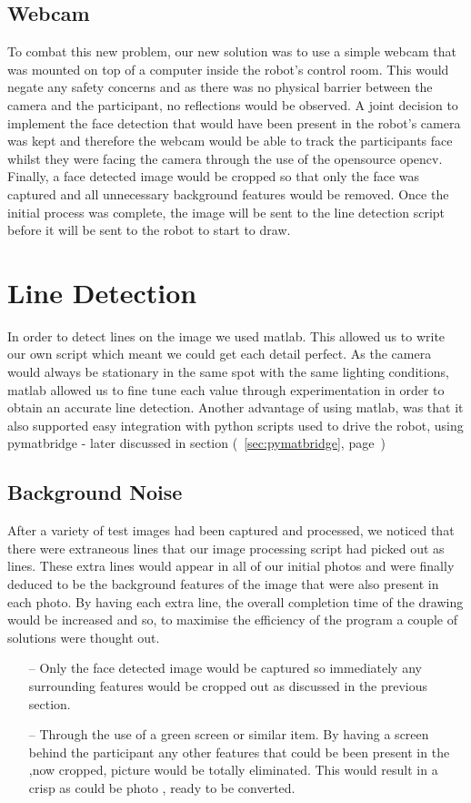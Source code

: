 \documentclass{l3proj}
\begin{document}
\subsection{Webcam}
To combat this new problem, our new solution was to use a simple webcam that was mounted on top of a computer inside the robot's control room. This would negate any safety concerns and as there was no physical barrier between the camera and the participant, no reflections would be observed. A joint decision to implement the face detection that would have been present in the robot's camera was kept and therefore the webcam would be able to track the participants face whilst they were facing the camera through the use of the opensource \gls{opencv}. Finally, a face detected image would be cropped so that only the face was captured and all unnecessary background features would be removed. Once the initial process was complete, the image will be sent to the line detection script before it will be sent to the robot to start to draw. 

\section{Line Detection}
In order to detect lines on the image we used \gls{matlab}. This allowed us to write our own script which meant we could get each detail perfect. As the camera would always be stationary in the same spot with the same lighting conditions, \gls{matlab} allowed us to fine tune each value through experimentation in order to obtain an accurate line detection.
Another advantage of using \gls{matlab}, was that it also supported easy integration with python scripts used to drive the robot, using \gls{pymatbridge} - later discussed in section (~\ref{sec:pymatbridge}, page~\pageref{sec:pymatbridge})

\subsection{Background Noise}
After a variety of test images had been captured and processed, we noticed that there were extraneous lines that our image processing script had picked out as lines. These extra lines would appear in all of our initial photos and were finally deduced to be the background features of the image that were also present in each photo. By having each extra line, the overall completion time of the drawing would be increased and so, to maximise the efficiency of the program a couple of solutions were thought out.
\begin{itemize}
\item[--] {Only the face detected image would be captured so immediately any surrounding features would be cropped out as discussed in the previous section.}
\item[--] {Through the use of a green screen or similar item. By having a screen behind the participant any other features that could be been present in the ,now cropped, picture would be totally eliminated. This would result in a crisp as could be photo , ready to be converted.}
\end {itemize}
\end{document}
